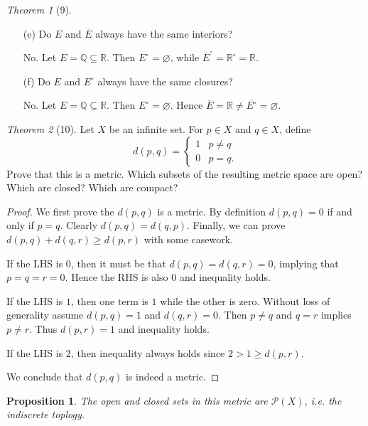 \documentclass[12pt]{article}
\newtheorem*{prop}{Proposition}
\theoremstyle{remark}
\theoremstyle{named}
\newtheorem*{theorem}{Theorem}
\begin{document}
\begin{theorem}[9]
\begin{enumerate}
        \item[(e)] Do $E$ and $\overline E$ always have the same interiors?
        
        No. Let $E = \mathbb Q \subseteq \mathbb R$. Then $E^\circ = \varnothing$, while $\overline E ^\circ = \mathbb R ^\circ = \mathbb R$.

        \item[(f)] Do $E$ and $E^\circ$ always have the same closures?
        
        No. Let $E = \mathbb Q \subseteq \mathbb R$. Then $E^\circ = \varnothing$. Hence $\overline E = \mathbb R \neq \overline{E^\circ} = \varnothing$. 
    \end{enumerate}
\end{theorem}

\begin{theorem}[10]
    Let $X$ be an infinite set. For $p \in X$ and $q \in X$, define 
    \[d(p, q) = 
    \begin{cases}
        1 & p \neq q \\ 0 & p = q.
    \end{cases}\]
    Prove that this is a metric. Which subsets of the resulting metric space are open? Which are closed? Which are compact?
\end{theorem}

\begin{proof}
    We first prove the $d(p, q)$ is a metric. By definition $d(p, q) = 0$ if and only if $p = q$. Clearly $d(p, q) = d(q, p)$. Finally, we can prove $d(p, q) + d(q, r) \ge d(p, r)$ with some casework. 
    
    If the LHS is 0, then it must be that $d(p, q) = d(q, r) = 0$, implying that $p = q = r = 0$. Hence the RHS is also $0$ and inequality holds.

    If the LHS is $1$, then one term is $1$ while the other is zero. Without loss of generality assume $d(p, q) = 1$ and $d(q, r) = 0$. Then $p \neq q$ and $q = r$ implies $p \neq r$. Thus $d(p, r) = 1$ and inequality holds. 

    If the LHS is 2, then inequality always holds since $2 > 1 \ge d(p, r)$.

    We conclude that $d(p, q)$ is indeed a metric. 
\end{proof}

\begin{prop}
    The open and closed sets in this metric are $\mathcal P (X)$, i.e. the indiscrete toplogy.   
\end{prop}
\end{document}
